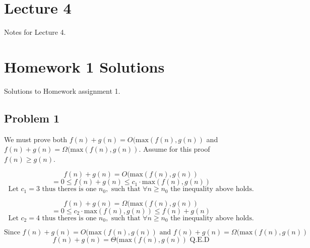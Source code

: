 \documentclass{article}
\begin{document}
\section{Lecture 4}

Notes for Lecture 4.
\iftrue
    

















\fi
\section{Homework 1 Solutions}

Solutions to Homework assignment 1.

\subsection{Problem 1}

We must prove both $f(n) + g(n) = O(\text{max}(f(n),g(n))$ and $f(n) + g(n) = \Omega(\text{max}(f(n),g(n))$. Assume for this proof $f(n) \ge g(n)$.

$$f(n) + g(n) = O(\text{max}(f(n),g(n))$$
$$= 0 \le f(n) + g(n) \le c_1 \cdot \text{max}(f(n),g(n))$$
$$\text{Let } c_1 = 3 \text{ thus theres is one } n_0, \text{ such that } \forall n \ge n_0 \text{ the inequality above holds.}$$

$$f(n) + g(n) = \Omega(\text{max}(f(n),g(n))$$
$$= 0 \le c_2 \cdot \text{max}(f(n),g(n)) \le f(n) + g(n) $$
$$\text{Let } c_2 = 4 \text{ thus theres is one } n_0, \text{ such that } \forall n \ge n_0 \text{ the inequality above holds.}$$

$$\text{Since } f(n) + g(n) = O(\text{max}(f(n),g(n)) \text{ and } f(n) + g(n) = \Omega(\text{max}(f(n),g(n)) $$
$$f(n) + g(n) = \Theta(\text{max}(f(n),g(n)) \text{ Q.E.D}$$
\end{document}
